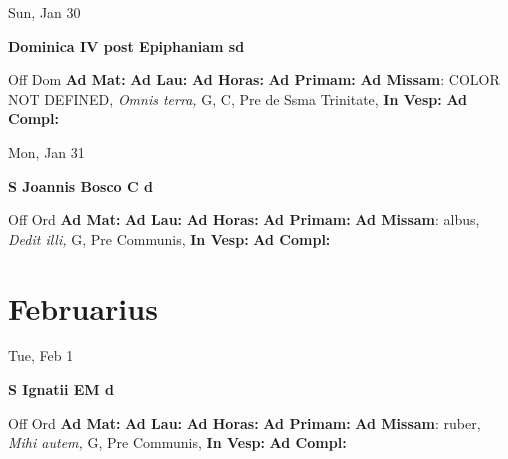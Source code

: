 \documentclass[10pt]{book}
\begin{document}
\begin{center}
\begin{minipage}{3.5in}
\vspace{2em}
\begin{center}Sun, Jan 30
\end{center}
\textbf{ \large Dominica IV post Epiphaniam
\textnormal{\normalsize sd}}

\begin{justify}Off Dom
\textbf{Ad Mat: }
\textbf{Ad Lau: }
\textbf{Ad Horas: }
\textbf{Ad Primam: }\textbf{Ad Missam}: COLOR NOT DEFINED, \textit{Omnis terra,} G, C, Pre de Ssma Trinitate, 
\textbf{In Vesp: }
\textbf{Ad Compl: }
\end{justify}
\end{minipage}
\end{center}

\begin{center}
\begin{minipage}{3.5in}
\vspace{2em}
\begin{center}Mon, Jan 31
\end{center}
\textbf{ \large S Joannis Bosco C
\textnormal{\normalsize d}}

\begin{justify}Off Ord
\textbf{Ad Mat: }
\textbf{Ad Lau: }
\textbf{Ad Horas: }
\textbf{Ad Primam: }\textbf{Ad Missam}: albus, \textit{Dedit illi,} G, Pre Communis, 
\textbf{In Vesp: }
\textbf{Ad Compl: }
\end{justify}
\end{minipage}
\end{center}

    \chapter*{Februarius}
                    
\begin{center}
\begin{minipage}{3.5in}
\vspace{2em}
\begin{center}Tue, Feb 1
\end{center}
\textbf{ \large S Ignatii EM
\textnormal{\normalsize d}}

\begin{justify}Off Ord
\textbf{Ad Mat: }
\textbf{Ad Lau: }
\textbf{Ad Horas: }
\textbf{Ad Primam: }\textbf{Ad Missam}: ruber, \textit{Mihi autem,} G, Pre Communis, 
\textbf{In Vesp: }
\textbf{Ad Compl: }
\end{justify}
\end{minipage}
\end{center}
\end{document}
